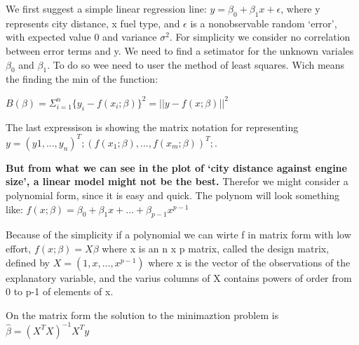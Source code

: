 \documentclass[
]{article}
\begin{document}
We first suggest a simple linear regression line:
\(y = \beta_{0} + \beta_{1} x + \epsilon\), where y represents city
distance, x fuel type, and \(\epsilon\) is a nonobservable random
`error', with expected value 0 and variance \(\sigma^2\). For simplicity
we consider no correlation between error terms and y. We need to find a
setimator for the unknown variales \(\beta_{0}\) and \(\beta_{1}\). To
do so wee need to user the method of least squares. Wich means the
finding the min of the function:

\center \(B(\beta)=\Sigma_{i=1}^n \{y_{i} -f(x_{i};\beta) \}^2 = ||y-f(x;\beta)||^2\)
\center

The last expressison is showing the matrix notation for representing
\(y = (y1,...,y_{n})^T; (f(x_{1};\beta),...,f(x_{m};\beta))^T;\).

\textbf{But from what we can see in the plot of `city distance against
engine size', a linear model might not be the best.} Therefor we might
consider a polynomial form, since it is easy and quick. The polynom will
look something like:
\center \(f(x;\beta) = \beta_{0} + \beta_{1} x + ... + \beta_{p-1} x^{p-1}\)
\center

Because of the simplicity if a polynomial we can wirte f in matrix form
with low effort, \center \(f(x;\beta)= X\beta\) \center where x is an n
x p matrix, called the design matrix, defined by
\cnter \(X=(1,x,...,x^{p-1})\) \center where x is the vector of the
observations of the explanatory variable, and the varius columns of X
contains powers of order from 0 to p-1 of elements of x.

On the matrix form the solution to the minimaztion problem is
\center \(\hat{\beta} = (X^{T}X)^{-1}X^{T}y\)
\end{document}
